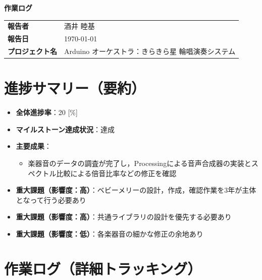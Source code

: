 \documentclass[a4paper,12pt]{ltjsarticle}
\begin{document}
\begin{center}
  {\LARGE\bfseries 作業ログ}
\end{center}

\vspace{4mm}

\begin{tabular}{ll}
  \textbf{報告者} & 酒井 睦基 \\
  \textbf{報告日} & \today \\
  \textbf{プロジェクト名} & Arduino オーケストラ：きらきら星 輪唱演奏システム \\
\end{tabular}

\vspace{6mm}

\section{進捗サマリー（要約）}

\begin{itemize}
  \item \textbf{全体進捗率}：20 [\%]
  \item \textbf{マイルストーン達成状況}：達成
  \item \textbf{主要成果}：
    \begin{itemize}
      \item 楽器音のデータの調査が完了し，Processingによる音声合成器の実装とスペクトル比較による倍音比率などの修正を確認
    \end{itemize}
  \item \textbf{重大課題（影響度：高）}：ベビーメリーの設計，作成，確認作業を3年が主体となって行う必要あり
  \item \textbf{重大課題（影響度：高）}：共通ライブラリの設計を優先する必要あり
  \item \textbf{重大課題（影響度：低）}：各楽器音の細かな修正の余地あり
\end{itemize}

\section{作業ログ（詳細トラッキング）}
\end{document}
